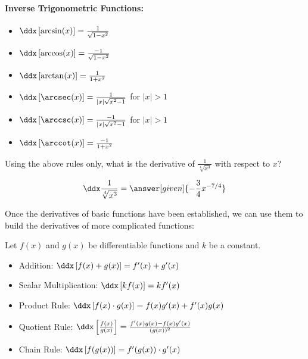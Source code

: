 \documentclass[nooutcomes]{ximera}
\begin{document}
\paragraph{Inverse Trigonometric Functions:}
\begin{itemize}
\item $\ddx \left[ \arcsin(x)\right] = \frac{1}{\sqrt{1-x^2}}$
\item $\ddx \left[ \arccos(x) \right]= \frac{-1}{\sqrt{1-x^2}}$
\item $\ddx \left[ \arctan(x) \right]=\frac{1}{1+x^2}$
\item $\ddx \left[ \arcsec(x)\right] = \frac{1}{|x|\sqrt{x^2-1}}$ for $|x|>1$
\item $\ddx \left[ \arccsc(x)\right] = \frac{-1}{|x|\sqrt{x^2-1}}$ for $|x|>1$
\item $\ddx \left[ \arccot(x) \right]= \frac{-1}{1+x^2}$
\end{itemize}



\begin{question} 
  Using the above rules only, what is the derivative of $\frac{1}{\sqrt[4]{x^3}}$ with respect to $x$?
  \begin{prompt} 
    \[
    \ddx \frac{1}{\sqrt[4]{x^3}} = \answer[given]{- \frac{3}{4} x^{-7/4}}
    \]
  \end{prompt}
\end{question}


Once the derivatives of basic functions have been established, we can use them to build the derivatives of more complicated functions:


\begin{theorem}
  Let $f(x)$ and $g(x)$ be differentiable functions and $k$ be a constant.
\begin{itemize}
\item Addition: $\ddx \left[ f(x) + g(x) \right] = f'(x) + g'(x)$
\item Scalar Multiplication: $\ddx \left[ k f(x) \right] = k f'(x)$
\item Product Rule: $\ddx \left[f(x) \cdot g(x) \right] = f(x)g'(x) + f'(x)g(x)$
\item Quotient Rule: $\ddx  \left[\frac{f(x)}{g(x)}  \right] = \frac{f'(x)g(x) - f(x)g'(x)}{(g(x))^2}$
\item Chain Rule: $\ddx  \left[f(g(x)) \right]  = f'(g(x)) \cdot g'(x)$
\end{itemize}
\end{theorem}
\end{document}
